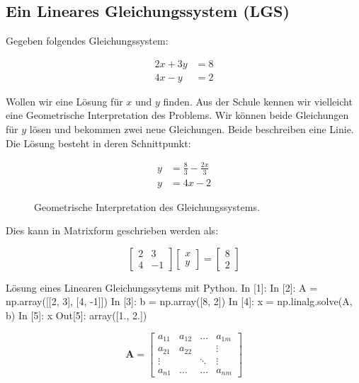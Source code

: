 \subsection*{Ein Lineares Gleichungssystem (LGS)}

Gegeben folgendes Gleichungssystem:

\[
\begin{aligned}
2x + 3y &= 8 \\
4x -  y &= 2
\end{aligned}
\]

Wollen wir eine Lösung für $x$ und $y$ finden. Aus der Schule kennen wir vielleicht eine Geometrische Interpretation des Problems. Wir können beide Gleichungen für $y$ lösen und bekommen zwei neue Gleichungen. Beide beschreiben eine Linie. Die Lösung besteht in deren Schnittpunkt:

\[
\begin{aligned}
y &= \frac{8}{3} - \frac{2 x}{3} \\
y &= 4 x - 2 
\end{aligned}
\]


\begin{figure}[h]
    \centering
    
    \caption{Geometrische Interpretation des Gleichungssystems.}
    \label{fig:lgs_geom}
\end{figure}


Dies kann in Matrixform geschrieben werden als:

\[
\begin{bmatrix} 2 & 3 \\ 4 & -1 \end{bmatrix}  
\begin{bmatrix} x \\ y \end{bmatrix}  
=
\begin{bmatrix} 8 \\ 2 \end{bmatrix}
\]

\begin{python}{Lösung eines Linearen Gleichungssytems mit Python.}
In [1]: %
In [2]: A = np.array([[2, 3], [4, -1]])
In [3]: b = np.array([8, 2])
In [4]: x = np.linalg.solve(A, b)
In [5]: x
Out[5]: array([1., 2.])
\end{python}




\begin{equation}
\mathbf{A} = \begin{bmatrix} a_{11} & a_{12} & \dots & a_{1m} \\
                    a_{21} & a_{22} &       &  \vdots   \\
                    \vdots &        &\ddots &  \vdots \\
                    a_{n 1} & \dots & \dots & a_{n m}
 \end{bmatrix}
\end{equation}




